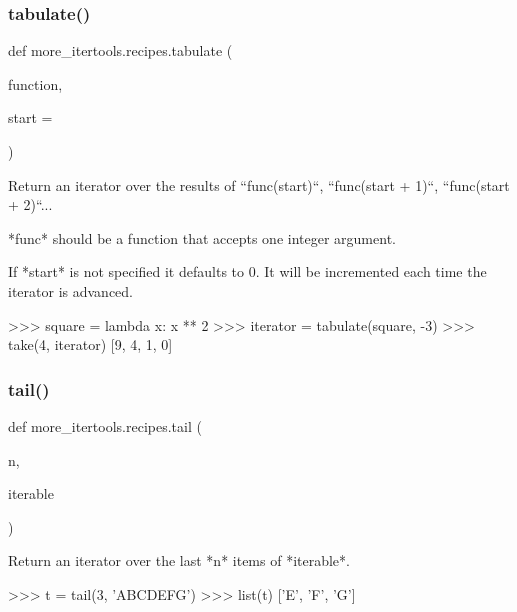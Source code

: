 \subsubsection{\texorpdfstring{tabulate()}{tabulate()}}
{\footnotesize\ttfamily def more\+\_\+itertools.\+recipes.\+tabulate (\begin{DoxyParamCaption}\item[{}]{function,  }\item[{}]{start = {} }\end{DoxyParamCaption})}

\begin{DoxyVerb}Return an iterator over the results of ``func(start)``,
``func(start + 1)``, ``func(start + 2)``...

*func* should be a function that accepts one integer argument.

If *start* is not specified it defaults to 0. It will be incremented each
time the iterator is advanced.

    >>> square = lambda x: x ** 2
    >>> iterator = tabulate(square, -3)
    >>> take(4, iterator)
    [9, 4, 1, 0]\end{DoxyVerb}
 \mbox{\label{namespacemore__itertools_1_1recipes_a6a78aabd5136eaa8ee9f020d0e743ee8}} 
\subsubsection{\texorpdfstring{tail()}{tail()}}
{\footnotesize\ttfamily def more\+\_\+itertools.\+recipes.\+tail (\begin{DoxyParamCaption}\item[{}]{n,  }\item[{}]{iterable }\end{DoxyParamCaption})}

\begin{DoxyVerb}Return an iterator over the last *n* items of *iterable*.

    >>> t = tail(3, 'ABCDEFG')
    >>> list(t)
    ['E', 'F', 'G']\end{DoxyVerb}
 \mbox{\label{namespacemore__itertools_1_1recipes_a98a7fa4325188c4f21ec27bdca3209c0}} 
